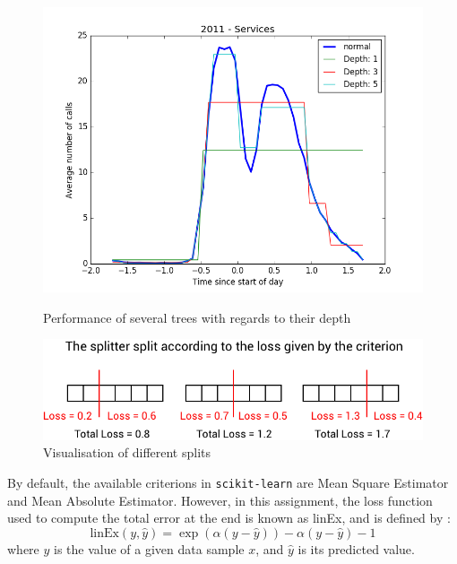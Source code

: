 \documentclass[a4paper,10pt]{article}
\begin{document}
  \begin{figure}[h]
    \begin{minipage}{0.48\textwidth}
      \centering
      \includegraphics[width=\textwidth]{graphics/1-TreeRegression.png}
      \caption{Performance of several trees with regards to their depth}
      \label{treePerf}
    \end{minipage}
    \hfill
    \begin{minipage}{0.48\textwidth}
      \centering
      \includegraphics[width=\textwidth]{graphics/splitterpng.png}
      \caption{Visualisation of different splits}
      \label{splitting}
    \end{minipage}
  \end{figure}
  By default, the available criterions in {\tt scikit-learn} are Mean Square Estimator and Mean Absolute Estimator. However, in this assignment, the loss function used to compute the total error at the end is known as linEx, and is defined by :
  \begin{equation}
    \text{linEx}(y,\hat{y}) = \exp \left( \alpha (y-\hat{y})\right) - \alpha (y-\hat{y}) -1
  \end{equation}
  where $y$ is the value of a given data sample $x$, and $\hat{y}$ is its predicted value.
\end{document}

